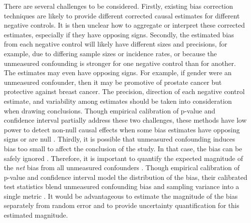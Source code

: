 There are several challenges to be considered. Firstly, existing bias correction techniques are likely to provide different corrected causal estimates for different negative controls. It is then unclear how to aggregate or interpret these corrected estimates, especially if they have opposing signs. Secondly, the estimated bias from each negative control will likely have different sizes and precisions, for example, due to differing sample sizes or incidence rates, or because the unmeasured confounding is stronger for one negative control than for another. The estimates may even have opposing signs. For example, if gender were an unmeasured confounder, then it may be promotive of prostate cancer but protective against breast cancer. The precision, direction of each negative control estimate, and variability among estimates should be taken into consideration when drawing conclusions. Though empirical calibration of p-value and confidence interval partially address these two challenges, these methods have low power to detect non-null causal effects when some bias estimates have opposing signs or are null \cite{gruber2016limitations}. Thirdly, it is possible that unmeasured confounding induces bias too small to affect the conclusion of the study. In that case, the bias can be safely ignored \cite{hernan2010causal}. Therefore, it is important to quantify the expected magnitude of the \textit{net} bias from all unmeasured confounders \cite{hernan2010causal, gruber2016limitations}. Though empirical calibration of p-value and confidence interval model the distribution of the bias, their calibrated test statistics blend unmeasured confounding bias and sampling variance into a single metric \cite{gruber2016limitations}. It would be advantageous to estimate the magnitude of the bias separately from random error and to provide uncertainty quantification for this estimated magnitude.

